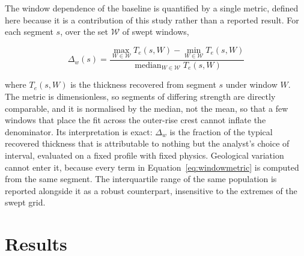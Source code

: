 \documentclass[final]{agujournal2019}
\begin{document}
The window dependence of the baseline is quantified by a single metric, defined
here because it is a contribution of this study rather than a reported result.
For each segment $s$, over the set $\mathcal{W}$ of swept windows,
\begin{linenomath*}
\begin{equation}
  \Delta_{w}(s) = \frac{\max_{W\in\mathcal{W}} T_{e}(s,W)
  - \min_{W\in\mathcal{W}} T_{e}(s,W)}
  {\operatorname{median}_{W\in\mathcal{W}} T_{e}(s,W)}
  \label{eq:windowmetric}
\end{equation}
\end{linenomath*}
where $T_{e}(s,W)$ is the thickness recovered from segment $s$ under window $W$.
The metric is dimensionless, so segments of differing strength are directly
comparable, and it is normalised by the median, not the mean, so that a
few windows that place the fit across the outer-rise crest cannot inflate the
denominator. Its interpretation is exact: $\Delta_{w}$ is the fraction of the
typical recovered thickness that is attributable to nothing but the analyst's
choice of interval, evaluated on a fixed profile with fixed physics. Geological
variation cannot enter it, because every term in Equation~\eqref{eq:windowmetric}
is computed from the same segment. The interquartile range of the same
population is reported alongside it as a robust counterpart, insensitive to the
extremes of the swept grid.

\section{Results}\label{sec:results}
\end{document}
